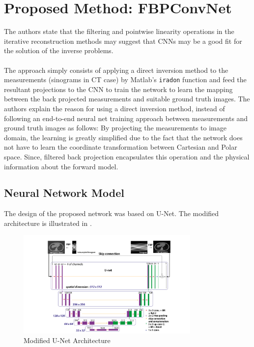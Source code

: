 \documentclass[journal, onecolumn, 11pt]{IEEEtran}
\begin{document}
\section{Proposed Method: FBPConvNet}

The authors state that the filtering and pointwise linearity operations in the iterative reconstruction methods may suggest that CNNs may be a good fit for the solution of the inverse problems. 
\\
\\
The approach simply consists of applying a direct inversion method to the measurements (sinograms in CT case) by Matlab's \texttt{iradon} function and feed the resultant projections to the CNN to train the network to learn the mapping between the back projected measurements and suitable ground truth images. 
The authors explain the reason for using a direct inversion method, instead of following an end-to-end neural net training approach between measurements and ground truth images as follows: 
By projecting the measurements to image domain, the learning is greatly simplified due to the fact that the network does not have to learn the coordinate transformation between Cartesian and Polar space. Since, filtered back projection encapsulates this operation and the physical information about the forward model. 

\subsection{Neural Network Model}

The design of the proposed network was based on U-Net. The modified architecture is illustrated in .

\begin{figure}[h]
\centering
\includegraphics[width=0.8\textwidth]{images/unet.png}
\caption{Modified U-Net Architecture}\label{fig:Unet}
\end{figure}
\end{document}
